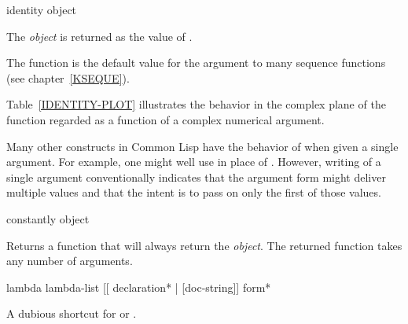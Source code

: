 \begin{defun}[Function]
identity object

The \emph{object} is returned as the value of .

The  function is the default value for the 
argument to many sequence functions (see chapter~\ref{KSEQUE}).

Table~\ref{IDENTITY-PLOT} illustrates the behavior in the complex plane
of the
 function regarded as a function of a complex numerical argument.

Many other constructs in Common Lisp have the behavior of 
when given a single argument.  For example, one might well use 
in place of .  However, writing  of a single
argument conventionally indicates that the argument form might deliver
multiple values and that the intent is to pass on only the first of
those values.




\end{defun}

\begin{defun}[Function]
constantly object

Returns a function that will always return the \emph{object}. The returned function
takes any number of arguments.
\end{defun}



\begin{defmac}
lambda lambda-list [[ {declaration}* | [doc-string]] {form}*

A dubious shortcut for  or .

\end{defmac}
